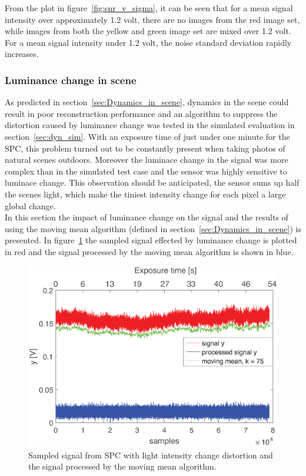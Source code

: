 From the plot in figure~\ref{fig:snr_v_sigma}, it can be seen that for a mean signal intensity over approximately 1.2 volt, there are no images from the red image set, while images from both the yellow and green image set are mixed over 1.2 volt. For a mean signal intensity under 1.2 volt, the noise standard deviation rapidly increases.


\subsubsection{Luminance change in scene}
As predicted in section~\ref{sec:Dynamics_in_scene}, dynamics in the scene could result in poor reconstruction performance and an algorithm to suppress the distortion caused by luminance change was tested in the simulated evaluation in section~\ref{sec:dyn_sim}. With an exposure time of just under one minute for the SPC, this problem turned out to be constantly present when taking photos of natural scenes outdoors. Moreover the luminace change in the signal was more complex than in the simulated test case and the sensor was highly sensitive to luminace change. This observation should be anticipated, the sensor sums up half the scenes light, which make the tiniest intensity change for each pixel a large global change.\\[0.1in] 

In this section the impact of luminance change on the signal and the results of using the moving mean algorithm (defined in section~\ref{sec:Dynamics_in_scene}) is presented. In figure~\ref{fig:lc_plot} the sampled signal effected by luminance change is plotted in red and the signal processed by the moving mean algorithm is shown in blue. 



\begin{figure}[H]
\includegraphics[width = 0.8\linewidth]{result/luminance/li.eps}
	\caption{Sampled signal from SPC with light intensity change distortion and the signal processed by the moving mean algorithm.}
	\label{fig:lc_plot}
\end{figure}



